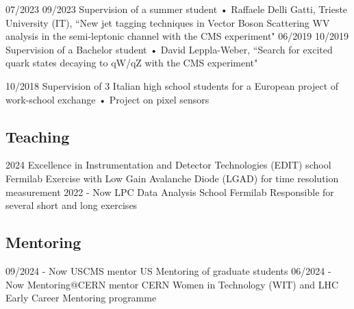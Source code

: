   \teaching
    {07/2023 \textemdash{} 09/2023}
    {Supervision of a summer student • }{Raffaele Delli Gatti, Trieste University (IT), ``New jet tagging techniques in Vector Boson Scattering WV analysis in the semi-leptonic channel with the CMS experiment"}
  \teaching
    {06/2019 \textemdash{} 10/2019}
    {Supervision of a Bachelor student • }{David Leppla-Weber, ``Search for excited quark states decaying to qW/qZ with the CMS experiment"}
      
  \teaching
    {10/2018}
    {Supervision of 3 Italian high school students for a European project of work-school exchange • }
    {Project on pixel sensors}
\subsection{Teaching}
\position
      {2024} 
      {Excellence in Instrumentation and Detector Technologies (EDIT) school}
      {Fermilab}
      {Exercise with Low Gain Avalanche Diode (LGAD) for time resolution measurement}
	\position
      {2022 - Now} 
      {LPC Data Analysis School}
      {Fermilab}
      {Responsible for several short and long exercises}
\subsection{Mentoring}
	\position
      {09/2024 - Now } 
      {USCMS mentor}
      {US}
      {Mentoring of graduate students}
	\position
      {06/2024 - Now } 
      {Mentoring@CERN mentor}
      {CERN}
      {Women in Technology (WIT) and LHC Early Career Mentoring programme}

